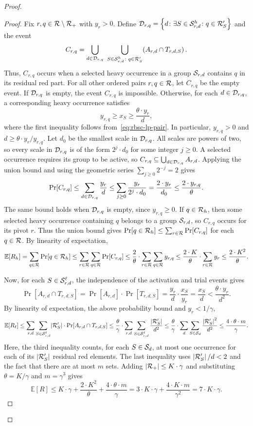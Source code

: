 \begin{proof}
\begin{proof}
Fix $r,q\in\mathcal{R}\setminus\mathcal{R}_+$ with $y_r>0$. Define $\mathcal{D}_{r,q}=\mathopen{}\left\{ d\colon \exists S\in\mathcal{S}^h_{r,d}\colon q\in\mathcal{R}'_S \right\}$ and the event
\[
 C_{r,q}=\bigcup_{d\in\cD_{r,q}}\ \bigcup_{S\in\cS^h_{r,d}\colon q\in\cR'_S}\br{A_{r,d}\cap T_{r,d,S}}.
\]
Thus, $C_{r,q}$ occurs when a selected heavy occurrence in a group $\mathcal{S}_{r,d}$ contains $q$ in its residual red part. For all other ordered pairs $r,q\in\mathcal{R}$, let $C_{r,q}$ be the empty event. If $\mathcal{D}_{r,q}$ is empty, the event $C_{r,q}$ is impossible. Otherwise, for each $d\in\mathcal{D}_{r,q}$, a corresponding heavy occurrence satisfies
\[
 y_{r,q}\geq x_S\geq\frac{\theta\cdot y_r}{d},
\]
where the first inequality follows from~\eqref{eq:rbsc-lp-pair}. In particular, $y_{r,q}>0$ and $d\geq\theta\cdot y_r/y_{r,q}$. Let $d_0$ be the smallest scale in $\mathcal{D}_{r,q}$. All scales are powers of two, so every scale in $\mathcal{D}_{r,q}$ is of the form $2^j\cdot d_0$ for some integer $j\geq0$. A selected occurrence requires its group to be active, so $C_{r,q}\subseteq\bigcup_{d\in\mathcal{D}_{r,q}}A_{r,d}$. Applying the union bound and using the geometric series $\sum_{j\geq0}2^{-j}=2$ gives
\[
 \Pr[C_{r,q}]\leq\sum_{d\in\mathcal{D}_{r,q}}\frac{y_r}{d}
 \leq\sum_{j\geq0}\frac{y_r}{2^j\cdot d_0}=\frac{2\cdot y_r}{d_0}
 \leq\frac{2\cdot y_{r,q}}{\theta}.
\]
The same bound holds when $\mathcal{D}_{r,q}$ is empty, since $y_{r,q}\geq0$. If $q\in\mathcal{R}_h$, then some selected heavy occurrence containing $q$ belongs to a group $\mathcal{S}_{r,d}$, so $C_{r,q}$ occurs for its pivot $r$. Thus the union bound gives $\Pr[q\in\mathcal{R}_h]\leq\sum_{r\in\mathcal{R}}\Pr[C_{r,q}]$ for each $q\in\mathcal{R}$. By linearity of expectation,
\[
 \mathbb{E}[R_h]
 =\sum_{q\in\mathcal{R}}\Pr[q\in\mathcal{R}_h]
 \leq\sum_{r\in\mathcal{R}}\sum_{q\in\mathcal{R}}\Pr[C_{r,q}]
 \leq\frac{2}{\theta}\cdot\sum_{r\in\mathcal{R}}\sum_{q\in\mathcal{R}}y_{r,q}
 \leq\frac{2\cdot K}{\theta}\cdot\sum_{r\in\mathcal{R}}y_r
 \leq\frac{2\cdot K^2}{\theta}.
\]

Now, for each $S\in\mathcal{S}^\ell_{r,d}$, the independence of the activation and trial events gives
\[
 \Pr[A_{r,d}\cap T_{r,d,S}]
 =\Pr[A_{r,d}]\cdot\Pr[T_{r,d,S}]
 =\frac{y_r}{d}\cdot\frac{x_S}{y_r}
 =\frac{x_S}{d}<\frac{\theta\cdot y_r}{d^2}.
\]
By linearity of expectation, the above probability bound and $y_r<1/\gamma$,
\[
 \mathbb{E}[R_\ell]
 \leq\sum_{r,d}\sum_{S\in\mathcal{S}^\ell_{r,d}}\mathopen{}\left| \mathcal{R}'_S \right|\cdot\Pr[A_{r,d}\cap T_{r,d,S}]
 \leq\frac{\theta}{\gamma}\cdot\sum_{r,d}\sum_{S\in\mathcal{S}^\ell_{r,d}}\frac{\mathopen{}\left| \mathcal{R}'_S \right|}{d^2}
 \leq\frac{\theta}{\gamma}\cdot\sum_d\sum_{S\in\mathcal{S}_d}\frac{\mathopen{}\left| \mathcal{R}'_S \right|^2}{d^2}
 \leq\frac{4\cdot\theta\cdot m}{\gamma}.
\]
Here, the third inequality counts, for each $S\in\mathcal{S}_d$, at most one occurrence for each of its $\mathopen{}\left| \mathcal{R}'_S \right|$ residual red elements. The last inequality uses $\mathopen{}\left| \mathcal{R}'_S \right|/d<2$ and the fact that there are at most $m$ sets. Adding $\mathopen{}\left| \mathcal{R}_+ \right|\leq K\cdot \gamma$ and substituting $\theta=K/\gamma$ and $m=\gamma^3$ gives
\begin{equation}\label{eq:rbsc-cost-expectation}
 \mathbb{E}[R]
 \leq K\cdot \gamma+\frac{2\cdot K^2}{\theta}+\frac{4\cdot\theta\cdot m}{\gamma}
 =3\cdot K\cdot \gamma+\frac{4\cdot K\cdot m}{\gamma^2}
 =7\cdot K\cdot \gamma.
\end{equation}
\end{proof}


\end{proof}
